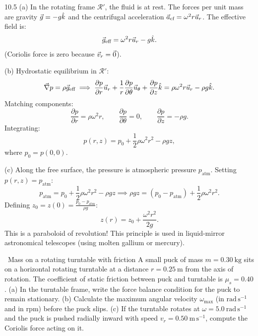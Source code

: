 \begin{solution}{10.5}
(a) In the rotating frame $\mathcal{R}'$, the fluid is at rest. The forces per unit mass are gravity $\vec{g} = -g\hat{k}$ and the centrifugal acceleration $\vec{a}_{\text{cf}} = \omega^2 r\vec{u}_r$.
The effective field is:
\[
\vec{g}_{\text{eff}} = \omega^2 r\vec{u}_r - g\hat{k}.
\]
(Coriolis force is zero because $\vec{v}_r = \vec{0}$).

(b) Hydrostatic equilibrium in $\mathcal{R}'$:
\[
\vec{\nabla} p = \rho\vec{g}_{\text{eff}} \implies \frac{\partial p}{\partial r}\vec{u}_r + \frac{1}{r}\frac{\partial p}{\partial \theta}\vec{u}_\theta + \frac{\partial p}{\partial z}\hat{k} = \rho\omega^2 r\vec{u}_r - \rho g\hat{k}.
\]
Matching components:
\[
\frac{\partial p}{\partial r} = \rho\omega^2 r,\qquad \frac{\partial p}{\partial \theta} = 0,\qquad \frac{\partial p}{\partial z} = -\rho g.
\]
Integrating:
\[
p(r, z) = p_0 + \frac{1}{2}\rho\omega^2 r^2 - \rho gz,
\]
where $p_0 = p(0, 0)$.

(c) Along the free surface, the pressure is atmospheric pressure $p_{\text{atm}}$. Setting $p(r, z) = p_{\text{atm}}$:
\[
p_{\text{atm}} = p_0 + \frac{1}{2}\rho\omega^2 r^2 - \rho gz \implies \rho gz = (p_0 - p_{\text{atm}}) + \frac{1}{2}\rho\omega^2 r^2.
\]
Defining $z_0 = z(0) = \frac{p_0 - p_{\text{atm}}}{\rho g}$:
\[
\boxed{z(r) = z_0 + \frac{\omega^2 r^2}{2g}.}
\]
This is a paraboloid of revolution! This principle is used in liquid-mirror astronomical telescopes (using molten gallium or mercury).
\end{solution}

\begin{exercise}{\core\ Mass on a rotating turntable with friction}
A small puck of mass $m=0.30\ \mathrm{kg}$ sits on a horizontal rotating turntable at a distance $r=0.25\ \mathrm{m}$ from the axis of rotation. The coefficient of static friction between puck and turntable is $\mu_s=0.40$.
(a) In the turntable frame, write the force balance condition for the puck to remain stationary.
(b) Calculate the maximum angular velocity $\omega_{\max}$ (in $\mathrm{rad\,s^{-1}}$ and in $\mathrm{rpm}$) before the puck slips.
(c) If the turntable rotates at $\omega = 5.0\ \mathrm{rad\,s^{-1}}$ and the puck is pushed radially inward with speed $v_r = 0.50\ \mathrm{m\,s^{-1}}$, compute the Coriolis force acting on it.
\end{exercise}

\begin{tabletworkspace}[5.5cm]
\end{tabletworkspace}

